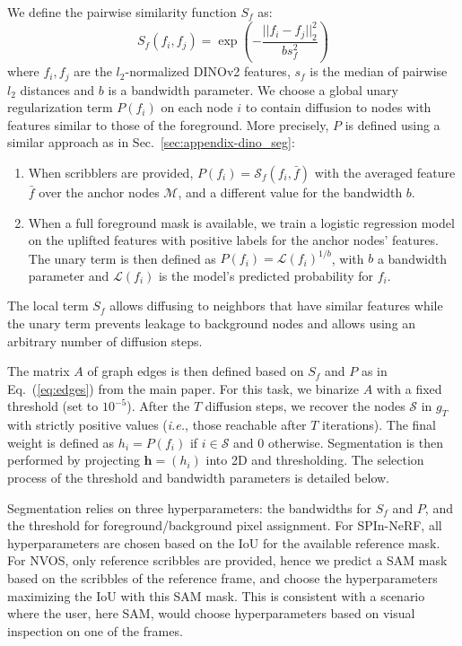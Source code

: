 We define the pairwise similarity function $S_f$ as:
\begin{equation}
    \label{eq:appendix-rbf}
    S_f(f_i, f_j) = \exp\left ( - \frac{||f_i - f_j||_2^2}{b s_f^2} \right)
\end{equation}
 where $f_i, f_j$ are the $l_2$-normalized DINOv2 features, $s_f$ is the median of pairwise $l_2$ distances and $b$ is a bandwidth parameter.
 We choose a global unary regularization term $P(f_i)$ on each node $i$ to contain diffusion to nodes with features similar to those of the foreground. More precisely, $P$ is defined using a similar approach as in Sec.~\ref{sec:appendix-dino_seg}: \begin{enumerate}
     \item When scribblers are provided, $P(f_i) = \mathcal{S}_{f}(f_i, \bar{f})$ with the averaged feature $\bar{f}$ over the anchor nodes $\mathcal{M}$, and a different value for the bandwidth $b$. 
     \item When a full foreground mask is available, we train a logistic regression model on the uplifted features with positive labels for the anchor nodes' features. The unary term is then defined as $P(f_i) = \mathcal{L}(f_i)^{1/b}$, with $b$ a bandwidth parameter and $\mathcal{L}(f_i)$ is the model's predicted probability for $f_i$.
 \end{enumerate}

The local term $S_f$ allows diffusing to neighbors that have similar features while the unary term prevents leakage to background nodes and allows using an arbitrary number of diffusion steps. 

The matrix $A$ of graph edges is then defined based on $S_f$ and $P$ as in Eq.~(\ref{eq:edges}) from the main paper.
For this task, we binarize $A$ with a fixed threshold (set to $10^{-5}$). After the $T$ diffusion steps, we recover the  nodes $\mathcal{S}$ in $g_T$ with strictly positive values (\emph{i.e.}, those reachable after $T$ iterations). The final weight is defined as $h_i = P(f_i)$ if $i\in \mathcal{S}$ and $0$ otherwise. Segmentation is then performed by projecting $\mathbf{h} = (h_i)$ into 2D and thresholding. The selection process of the threshold and bandwidth parameters is detailed below.

Segmentation relies on three hyperparameters: the bandwidths for $S_f$ and $P$, and the threshold for foreground/background pixel assignment. 
For SPIn-NeRF, all hyperparameters are chosen based on the IoU for the available reference mask. For NVOS, only reference scribbles are provided, hence we predict a SAM mask based on the scribbles of the reference frame, and choose the hyperparameters maximizing the IoU with this SAM mask. This is consistent with a scenario where the user, here SAM, would choose hyperparameters based on visual inspection on one of the frames.

